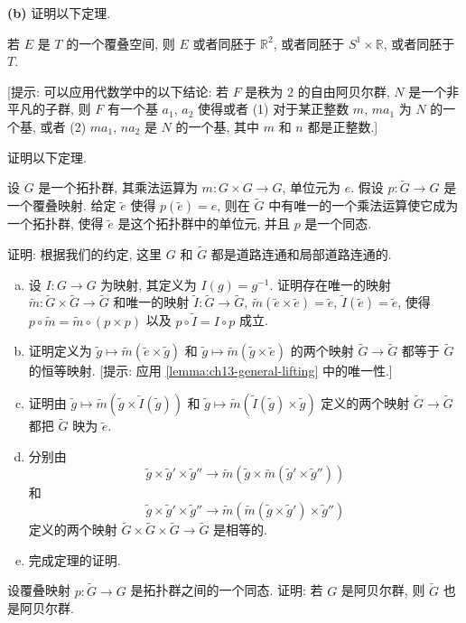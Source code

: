 \begin{exercise}
\label{exercise:ch13-sec79-05b}
\textbf{(b)} 证明以下定理.

\begin{theorem}[环面覆叠空间的分类]
\label{theorem:ch13-torus-covering-classification}
若 $E$ 是 $T$ 的一个覆叠空间, 则 $E$ 或者同胚于 $\mathbb{R}^{2}$, 或者同胚于 $S^{1}\times\mathbb{R}$, 或者同胚于 $T$.
\end{theorem}
[提示: 可以应用代数学中的以下结论: 若 $F$ 是秩为 $2$ 的自由阿贝尔群, $N$ 是一个非平凡的子群, 则 $F$ 有一个基 $a_{1}$, $a_{2}$ 使得或者 (1) 对于某正整数 $m$, $ma_{1}$ 为 $N$ 的一个基, 或者 (2) $ma_{1}$, $na_{2}$ 是 $N$ 的一个基, 其中 $m$ 和 $n$ 都是正整数.]
\end{exercise}

\begin{exercise}
\label{exercise:ch13-sec79-06}
证明以下定理.

\begin{theorem}[拓扑群的覆叠空间诱导群结构]
\label{theorem:ch13-covering-topological-group}
设 $G$ 是一个拓扑群, 其乘法运算为 $m\colon G\times G\to G$, 单位元为 $e$. 假设 $p\colon\widetilde{G}\to G$ 是一个覆叠映射. 给定 $\widetilde{e}$ 使得 $p(\widetilde{e})=e$, 则在 $\widetilde{G}$ 中有唯一的一个乘法运算使它成为一个拓扑群, 使得 $\widetilde{e}$ 是这个拓扑群中的单位元, 并且 $p$ 是一个同态.
\end{theorem}
证明: 根据我们的约定, 这里 $G$ 和 $\widetilde{G}$ 都是道路连通和局部道路连通的.
\begin{enumerate}[(a)]
\item 设 $I\colon G\to G$ 为映射, 其定义为 $I(g)=g^{-1}$. 证明存在唯一的映射 $\widetilde{m}\colon\widetilde{G}\times\widetilde{G}\to\widetilde{G}$ 和唯一的映射 $\widetilde{I}\colon\widetilde{G}\to\widetilde{G}$, $\widetilde{m}(\widetilde{e}\times\widetilde{e})=\widetilde{e}$, $\widetilde{I}(\widetilde{e})=\widetilde{e}$, 使得 $p\circ\widetilde{m}=\widetilde{m}\circ(p\times p)$ 以及 $p\circ\widetilde{I}=I\circ p$ 成立.
\item 证明定义为 $\widetilde{g}\mapsto\widetilde{m}(\widetilde{e}\times\widetilde{g})$ 和 $\widetilde{g}\mapsto\widetilde{m}(\widetilde{g}\times\widetilde{e})$ 的两个映射 $\widetilde{G}\to\widetilde{G}$ 都等于 $\widetilde{G}$ 的恒等映射. [提示: 应用 \cref{lemma:ch13-general-lifting} 中的唯一性.]
\item 证明由 $\widetilde{g}\mapsto\widetilde{m}(\widetilde{g}\times\widetilde{I}(\widetilde{g}))$ 和 $\widetilde{g}\mapsto\widetilde{m}(\widetilde{I}(\widetilde{g})\times\widetilde{g})$ 定义的两个映射 $\widetilde{G}\to\widetilde{G}$ 都把 $\widetilde{G}$ 映为 $\widetilde{e}$.
\item 分别由
\[
\widetilde{g}\times\widetilde{g}'\times\widetilde{g}''\to\widetilde{m}(\widetilde{g}\times\widetilde{m}(\widetilde{g}'\times\widetilde{g}''))
\]
和
\[
\widetilde{g}\times\widetilde{g}'\times\widetilde{g}''\to\widetilde{m}(\widetilde{m}(\widetilde{g}\times\widetilde{g}')\times\widetilde{g}'')
\]
定义的两个映射 $\widetilde{G}\times\widetilde{G}\times\widetilde{G}\to\widetilde{G}$ 是相等的.
\item 完成定理的证明.
\end{enumerate}
\end{exercise}

\begin{exercise}
\label{exercise:ch13-sec79-07}
设覆叠映射 $p\colon\widetilde{G}\to G$ 是拓扑群之间的一个同态. 证明: 若 $G$ 是阿贝尔群, 则 $\widetilde{G}$ 也是阿贝尔群.
\end{exercise}

